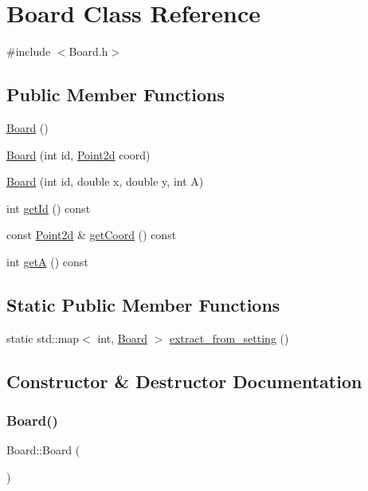 \hypertarget{class_board}{}\section{Board Class Reference}
\label{class_board}


{\ttfamily \#include $<$Board.\+h$>$}

\subsection*{Public Member Functions}
\begin{DoxyCompactItemize}
\item 
\hyperlink{class_board_a9ee491d4fea680cf69b033374a9fdfcb}{Board} ()
\item 
\hyperlink{class_board_af77a74155429debae2f0ee0ea424658c}{Board} (int id, \hyperlink{class_point2d}{Point2d} coord)
\item 
\hyperlink{class_board_abd0f454786cadfcbfbfc0a5bdf922542}{Board} (int id, double x, double y, int A)
\item 
int \hyperlink{class_board_ad46291901cf39cefa566df88e035698d}{get\+Id} () const
\item 
const \hyperlink{class_point2d}{Point2d} \& \hyperlink{class_board_a3b0c3eb250898188bf2b6d591f57ec55}{get\+Coord} () const
\item 
int \hyperlink{class_board_a041a59160ae5d73e8eb0fc73cc71dc7f}{getA} () const
\end{DoxyCompactItemize}
\subsection*{Static Public Member Functions}
\begin{DoxyCompactItemize}
\item 
static std\+::map$<$ int, \hyperlink{class_board}{Board} $>$ \hyperlink{class_board_a967d8a86e8fe2b1a2434392a1cdc9ee5}{extract\+\_\+from\+\_\+setting} ()
\end{DoxyCompactItemize}


\subsection{Constructor \& Destructor Documentation}
\mbox{\label{class_board_a9ee491d4fea680cf69b033374a9fdfcb}} 
\subsubsection{\texorpdfstring{Board()}{Board()}\hspace{0.1cm}{\footnotesize\ttfamily [1/3]}}
{\footnotesize\ttfamily Board\+::\+Board (\begin{DoxyParamCaption}{ }\end{DoxyParamCaption})\hspace{0.3cm}{\ttfamily [inline]}}

